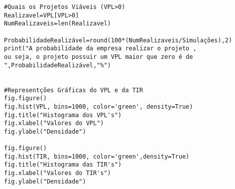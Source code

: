 \documentclass[11pt]{article}
\begin{document}
\begin{verbatim}
#Quais os Projetos Viáveis (VPL>0)
Realizavel=VPL[VPL>0]
NumRealizaveis=len(Realizavel)

ProbabilidadeRealizável=round(100*(NumRealizaveis/Simulações),2)
print("A probabilidade da empresa realizar o projeto ,
ou seja, o projeto possuir um VPL maior que zero é de  ",ProbabilidadeRealizável,"%")


#Representções Gráficas do VPL e da TIR
fig.figure()
fig.hist(VPL, bins=1000, color='green', density=True)
fig.title("Histograma dos VPL's")
fig.xlabel("Valores do VPL")
fig.ylabel("Densidade")

fig.figure()
fig.hist(TIR, bins=1000, color='green',density=True)
fig.title("Histograma das TIR's")
fig.xlabel("Valores do TIR's")
fig.ylabel("Densidade")
\end{verbatim}
\end{document}

